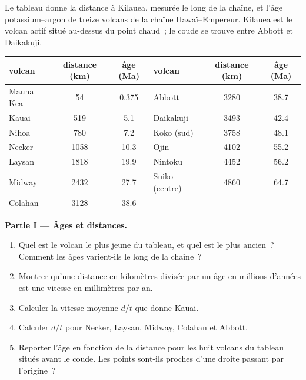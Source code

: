 \begin{problem}
\label{pb:g11:plate-motions:1}
Le tableau donne la distance à Kilauea, mesurée le long de la chaîne, et
l'âge potassium--argon de treize volcans de la chaîne Hawaï--Empereur.
Kilauea est le volcan actif situé au-dessus du point chaud~; le coude se
trouve entre Abbott et Daikakuji.

\begin{center}
\small
\begin{tabular}{|l|c|c||l|c|c|}
\hline
volcan & distance (\unit{km}) & âge (\unit{Ma}) & volcan & distance (\unit{km}) & âge (\unit{Ma}) \\ \hline
Mauna Kea & 54 & 0.375 & Abbott & 3280 & 38.7 \\ \hline
Kauai & 519 & 5.1 & Daikakuji & 3493 & 42.4 \\ \hline
Nihoa & 780 & 7.2 & Koko (sud) & 3758 & 48.1 \\ \hline
Necker & 1058 & 10.3 & Ojin & 4102 & 55.2 \\ \hline
Laysan & 1818 & 19.9 & Nintoku & 4452 & 56.2 \\ \hline
Midway & 2432 & 27.7 & Suiko (centre) & 4860 & 64.7 \\ \hline
Colahan & 3128 & 38.6 & & & \\ \hline
\end{tabular}
\end{center}

\medskip
\noindent\textbf{Partie I --- Âges et distances.}
\begin{enumerate}
  \item Quel est le volcan le plus jeune du tableau, et quel est le plus
        ancien~? Comment les âges varient-ils le long de la chaîne~?
  \item Montrer qu'une distance en kilomètres divisée par un âge en
        millions d'années est une vitesse en millimètres par an.
  \item Calculer la vitesse moyenne $d/t$ que donne Kauai.
  \item Calculer $d/t$ pour Necker, Laysan, Midway, Colahan et Abbott.
  \item Reporter l'âge en fonction de la distance pour les huit volcans du
        tableau situés avant le coude. Les points sont-ils proches d'une
        droite passant par l'origine~?
\end{enumerate}


\end{problem}
